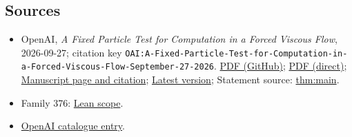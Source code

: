 \documentclass[11pt]{article}
\begin{document}
\subsection{Sources}
\begin{itemize}
\item OpenAI, \emph{A Fixed Particle Test for Computation in a Forced Viscous Flow}, 2026-09-27; citation key \texttt{OAI:A-Fixed-Particle-Test-for-Computation-in-a-Forced-Viscous-Flow-September-27-2026}. \href{https://github.com/openai/math/blob/adc7f1241b42e322a6451854ab7e4b4c146bf78a/preprints/A-Fixed-Particle-Test-for-Computation-in-a-Forced-Viscous-Flow-September-27-2026/manuscript.pdf}{PDF (GitHub)}; \href{https://github.com/openai/math/raw/adc7f1241b42e322a6451854ab7e4b4c146bf78a/preprints/A-Fixed-Particle-Test-for-Computation-in-a-Forced-Viscous-Flow-September-27-2026/manuscript.pdf}{PDF (direct)}; \href{https://github.com/openai/math/blob/adc7f1241b42e322a6451854ab7e4b4c146bf78a/preprints/A-Fixed-Particle-Test-for-Computation-in-a-Forced-Viscous-Flow-September-27-2026/README.md}{Manuscript page and citation}; \href{https://github.com/openai/math/blob/main/preprints/A-Fixed-Particle-Test-for-Computation-in-a-Forced-Viscous-Flow-September-27-2026/manuscript.pdf}{Latest version}; Statement source: \href{https://github.com/openai/math/blob/adc7f1241b42e322a6451854ab7e4b4c146bf78a/preprints/A-Fixed-Particle-Test-for-Computation-in-a-Forced-Viscous-Flow-September-27-2026/build/main.tex\#L149}{thm:main}.
\item Family 376: \href{https://github.com/openai/math/blob/adc7f1241b42e322a6451854ab7e4b4c146bf78a/lean/docs/376.md}{Lean scope}.
\item \href{https://github.com/openai/math/blob/adc7f1241b42e322a6451854ab7e4b4c146bf78a/CONTENTS.md}{OpenAI catalogue entry}.
\end{itemize}
\end{document}
